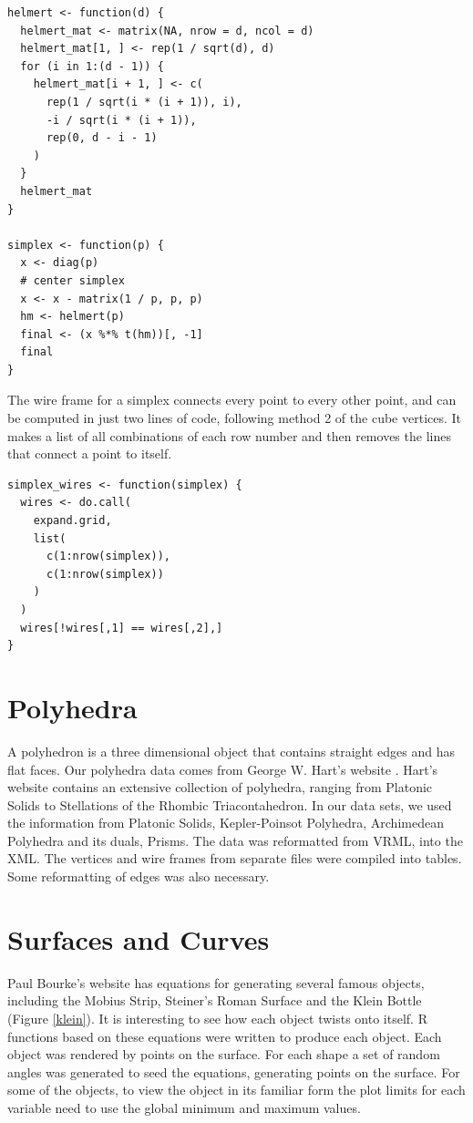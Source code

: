 \begin{verbatim}
helmert <- function(d) {
  helmert_mat <- matrix(NA, nrow = d, ncol = d)
  helmert_mat[1, ] <- rep(1 / sqrt(d), d)
  for (i in 1:(d - 1)) {
    helmert_mat[i + 1, ] <- c(
      rep(1 / sqrt(i * (i + 1)), i),
      -i / sqrt(i * (i + 1)),
      rep(0, d - i - 1)
    )
  }
  helmert_mat
}

simplex <- function(p) {
  x <- diag(p)
  # center simplex
  x <- x - matrix(1 / p, p, p)
  hm <- helmert(p)
  final <- (x %*% t(hm))[, -1]
  final
}
\end{verbatim}

The wire frame for a simplex connects every point to every other point, and can
be computed in just two lines of code, following method 2 of the cube
vertices. It makes a list of all combinations of each row number and then
removes the lines that connect a point to itself.

\begin{verbatim}
simplex_wires <- function(simplex) {
  wires <- do.call(
    expand.grid,
    list(
      c(1:nrow(simplex)),
      c(1:nrow(simplex))
    )
  )
  wires[!wires[,1] == wires[,2],]
}
\end{verbatim}

\section{Polyhedra}

A polyhedron is a three dimensional object that contains straight
edges and has flat faces. Our polyhedra data comes from George
W. Hart's website \citep{GeorgeVP}. Hart's website contains an
extensive collection of polyhedra, ranging from Platonic Solids to
Stellations of the Rhombic Triacontahedron. In our data sets, we used
the information from Platonic Solids, Kepler-Poinsot Polyhedra,
Archimedean Polyhedra and its duals, Prisms. The data was reformatted
from VRML, into the XML. The vertices and wire frames from separate
files were compiled into tables. Some reformatting of edges was also
necessary.

\section{Surfaces and Curves}

Paul Bourke's website \citep{PBCurves} has equations for generating
several famous objects, including the Mobius Strip, Steiner's Roman
Surface and the Klein Bottle (Figure \ref{klein}). It is interesting to see how each object
twists onto itself.  R functions based on these equations were written
to produce each object.  Each object was rendered by points on the
surface. For each shape a set of random angles was generated to seed
the equations, generating points on the surface.  For some of the
objects, to view the object in its familiar form the plot limits for each
variable need to use the global minimum and maximum values.

